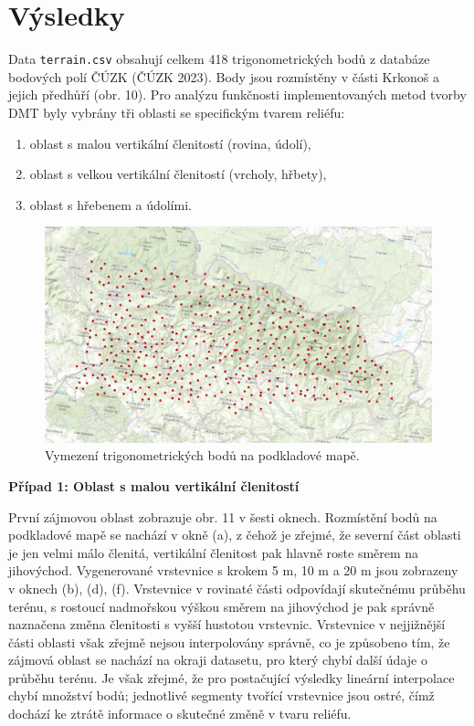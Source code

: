 \chapter*{Výsledky}
\par Data \verb|terrain.csv| obsahují celkem 418 trigonometrických bodů z databáze bodových polí ČÚZK (ČÚZK 2023). Body jsou rozmístěny v části Krkonoš a jejich předhůří (obr. 10). Pro analýzu funkčnosti implementovaných metod tvorby DMT byly vybrány tři oblasti se specifickým tvarem reliéfu: 
\begin{enumerate}
    \item oblast s malou vertikální členitostí (rovina, údolí),
    \item oblast s velkou vertikální členitostí (vrcholy, hřbety),
    \item oblast s hřebenem a údolími.
\end{enumerate}

\begin{figure}[H]
\centering
\includegraphics[width=15cm]{images/krkonose2.png} 
    \caption{Vymezení trigonometrických bodů na podkladové mapě.}
\end{figure}
\bigbreak
\par {\large\textbf{Případ 1: Oblast s malou vertikální členitostí} }
\par První zájmovou oblast zobrazuje obr. 11 v šesti oknech. Rozmístění bodů na podkladové mapě se nachází v okně (a), z čehož je zřejmé, že severní část oblasti je jen velmi málo členitá, vertikální členitost pak hlavně roste směrem na jihovýchod. Vygenerované vrstevnice s krokem 5 m, 10 m a 20 m jsou zobrazeny v oknech (b), (d), (f). Vrstevnice v rovinaté části odpovídají skutečnému průběhu terénu, s rostoucí nadmořskou výškou směrem na jihovýchod je pak správně naznačena změna členitosti s vyšší hustotou vrstevnic. Vrstevnice v nejjižnější části oblasti však zřejmě nejsou interpolovány správně, co je způsobeno tím, že zájmová oblast se nachází na okraji datasetu, pro který chybí další údaje o průběhu terénu. Je však zřejmé, že pro postačující výsledky lineární interpolace chybí množství bodů; jednotlivé segmenty tvořící vrstevnice jsou ostré, čímž dochází ke ztrátě informace o skutečné změně v tvaru reliéfu. 

